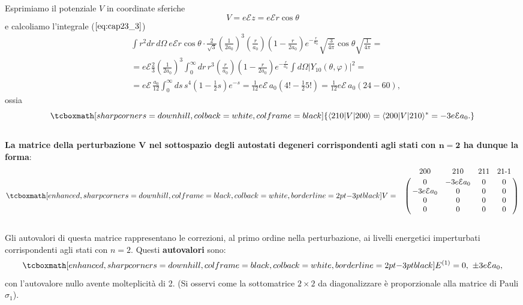 \documentclass[a4paper,12pt,oneside]{book}
\begin{document}
Esprimiamo il potenziale $V$ in coordinate sferiche 
\begin{equation}
V=e \mathcal{E}z=e \mathcal{E} r \cos\theta
\end{equation}
e calcoliamo l'integrale ($\ref{eq:cap23_3}$) 
	\begin{align}
		 &  \int r^2 dr\, d\Omega \   e \mathcal{E} r \cos\theta \cdot    \frac{2}{\sqrt{3}} \left( \frac{1}{2a_0} \right)^{3}   \left( \frac{r}{a_0} \right)     \left( 1-\frac{r}{2a_0} \right)  e^{-\frac{r}{a_0}}\sqrt{\frac{3}{4 \pi}} \cos \theta \sqrt{\frac{1}{4 \pi}}=  \nonumber \\ 
		 & =  e \mathcal{E}  \frac{2}{3}  \left( \frac{1}{2a_0} \right)^{3} \int_0^{\infty} dr \, r^3 \left( \frac{r}{a_0} \right)     \left( 1-\frac{r}{2a_0} \right)  e^{-\frac{r}{a_0}}  \int d\Omega \left| Y_{10}(\theta, \varphi) \right|^2=  \nonumber \\
		 & =  e \mathcal{E} \, \frac{a_0}{12} \int_0^{\infty} ds \, s^4 \left(1-\frac{1}{2}s \right) e^{-s} = \frac{1}{12} e \mathcal{E} \, a_0 \left( 4!-\frac{1}{2}5! \right)= \frac{1}{12}  e \mathcal{E} \, a_0 (24-60),
	\end{align}
ossia 
	\begin{equation} 
		\tcboxmath[sharp corners=downhill, colback=white, colframe=black]{
			\langle 210|V|200\rangle= \langle 200 |V |210 \rangle^*=-3e\mathcal{E}a_0. 
			}
	\end{equation}\\
	
\textbf{La matrice della perturbazione $\boldsymbol{V}$ nel sottospazio degli autostati degeneri corrispondenti agli stati con $\boldsymbol{n=2}$ ha dunque la forma}:
	\begin{equation}  
		\tcboxmath[enhanced, sharp corners=downhill, colframe=black, colback=white, borderline={2pt}{-3pt}{black}]{
			V=
			\bordermatrix{~&200&210&211&21\textrm{-}1\cr
			& 0 & -3e\mathcal{E}a_0 & 0 & 0 \cr
			& -3e\mathcal{E}a_0 & 0 & 0 & 0 \cr
			& 0 & 0 & 0 & 0 \cr
			& 0 & 0 & 0 & 0 \cr}
			}
	\end{equation}\\
	
Gli autovalori di questa matrice rappresentano le correzioni, al primo ordine nella perturbazione, ai livelli energetici imperturbati corrispondenti agli stati con $n=2$. Questi \textbf{autovalori} sono:
	\begin{equation} 
		\tcboxmath[enhanced, sharp corners=downhill, colframe=black, colback=white, borderline={2pt}{-3pt}{black}]{
			E^{(1)}=0, \ \pm 3e\mathcal{E}a_0,
			}
	\end{equation}
con l'autovalore nullo avente molteplicità di 2. (Si osservi come la sottomatrice $2\times2$ da diagonalizzare è proporzionale alla matrice di Pauli $\sigma_1$).\\
\end{document}
